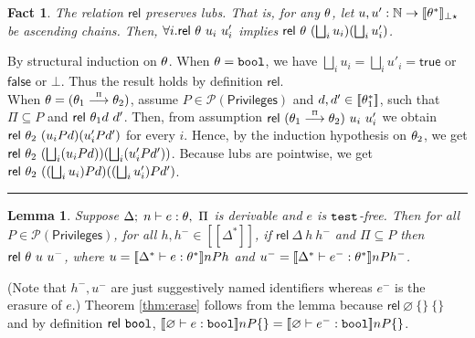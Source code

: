 \documentclass[submission,copyright,creativecommons]{eptcs}
\newcommand{\blackslug}{\rule{7pt}{7pt}}
\newcommand{\BOOL}{\mbox{\texttt{bool}}}
\renewcommand{\P}{\mathcal{P}}
\newcommand{\ldb}{[\![}
\newcommand{\rdb}{]\!]}
\newcommand{\means}[1]{\ldb {#1}\rdb}
\newcommand{\proves}{\vdash}
\newcommand{\Empty}{\varnothing}
\def\lpields#1{\stackrel{#1}{\longrightarrow}}
\newcommand{\annoto}[1]{\lpields {\scriptscriptstyle #1}}
\newcommand{\Lub}{\bigsqcup}
\newcommand{\nats}{{\mathbb{N}}}
\newcommand{\PRIV}{{\mathsf{Privileges}}}
\newcommand{\TEST}{\mbox{\texttt{test}}}
\newcommand{\Rel}{\textsf{rel}}
\newcommand{\n}{n} \newcommand{\p}{p} \newcommand{\Ps}{\Pi} \newcommand{\h}{h}
\newtheorem{lemma}[theorem]{Lemma}
\newtheorem{factx}[theorem]{Fact}
\newenvironment{proof}{\begin{trivlist}\item[\hskip\labelsep{\bf
Proof:}]}{\blackslug\end{trivlist}}
\begin{document}
\begin{factx}
\label{fac:reladm}
The relation $\Rel$ preserves lubs. That is, for any $\theta$,
let $u, u':\nats\to\means{\th^*}_{\bot\star}$ be ascending chains. Then,
$\forall i.\Rel~\th~u_i~u'_i$ implies $\Rel~\th~(\Lub_{i}u_i)(\Lub_{i}u'_i)$.
\end{factx}
\begin{proof}
By structural induction on $\theta$. When $\th=\BOOL$, we have
$\Lub_{i}u_i=\Lub_{i}u'_i= 
\mathsf{true}$ or $\mathsf{false}$ or $\bot$.  Thus the result holds by 
definition $\Rel$. \\
When $\th=(\th_1\annoto{\Ps}\th_2)$, assume $P\in\P(\PRIV)$ and 
$d, d'\in\means{\th_1^*}$, such that $\Ps\subseteq P$ and 
$\Rel~\th_{1}d~d'$. Then, from assumption $\Rel~(\th_1\annoto{\Ps}\th_2)~u_i~u'_i$ 
we obtain $\Rel~\th_2~(u_{i} P d)(u'_{i} P d')$ for every $i$. Hence, by 
the induction hypothesis on $\theta_2$, we get 
$\Rel~\th_2~(\Lub_{i}(u_{i} P d))(\Lub_{i}(u'_{i} P d'))$. Because 
lubs are pointwise, we get $\Rel~\th_2~((\Lub_{i}u_{i}) P d)((\Lub_{i}u'_{i}) P d')$.
\end{proof}
\begin{lemma}
\label{lem:rem}
Suppose $\Delta;\;\n\proves e:\th,~\Ps$ is derivable and $e$ is $\TEST$-free.
Then for all $P\in\P(\PRIV)$, for all $\h, \h^-\in
\means{\Delta^*}$, if $\Rel~ {\Delta}~\h~\h^-$ and $\Ps\subseteq P$ then  
$\Rel~\th~u~u^-$, where $u=\means{\Delta^*\proves e:\th^*}\n P \h$ 
and $u^-=\means{\Delta^*\proves e^-:\th^*}\n P \h^-$. 
\end{lemma}
(Note that $h^-, u^-$ are just suggestively named identifiers whereas
$e^-$ is the erasure of $e$.)
Theorem \ref{thm:erase} follows from the lemma because $\Rel~\Empty~\{\}~\{\}$ and
by definition $\Rel~\BOOL$, $\means{\Empty\proves e:\BOOL}\n P\{\}=
\means{\Empty\proves e^-:\BOOL}\n P\{\}$.
\end{document}

